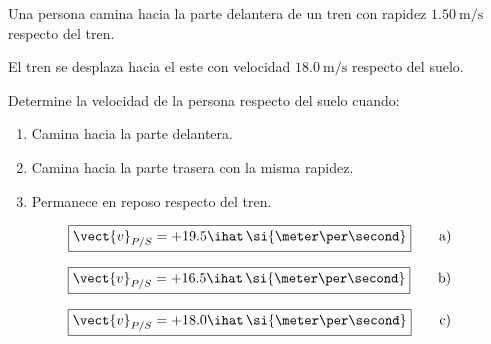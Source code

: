\begin{ejercicio}
Una persona camina hacia la parte delantera de un tren
con rapidez \(\SI{1.50}{\meter\per\second}\) respecto
del tren.

El tren se desplaza hacia el este con velocidad
\(\SI{18.0}{\meter\per\second}\) respecto del suelo.

Determine la velocidad de la persona respecto del suelo
cuando:

\begin{enumerate}[label=\alph*)]
    \item Camina hacia la parte delantera.
    \item Camina hacia la parte trasera con la misma rapidez.
    \item Permanece en reposo respecto del tren.
\end{enumerate}
\end{ejercicio}

\begin{respuesta}
\[
\boxed{
\vect{v}_{P/S}
=
+19.5\ihat\,
\si{\meter\per\second}
}
\qquad \text{a)}
\]

\[
\boxed{
\vect{v}_{P/S}
=
+16.5\ihat\,
\si{\meter\per\second}
}
\qquad \text{b)}
\]

\[
\boxed{
\vect{v}_{P/S}
=
+18.0\ihat\,
\si{\meter\per\second}
}
\qquad \text{c)}
\]
\end{respuesta}

